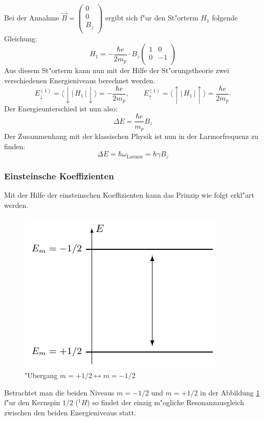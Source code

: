 Bei der Annahme $\vec{B} = \begin{pmatrix}
0 \\
0 \\
B_z \\
\end{pmatrix}$ ergibt sich f"ur den St"orterm $H_1$ folgende Gleichung:
\begin{equation}
H_1 = -\frac{\hbar e}{2m_p} \cdot B_z \begin{pmatrix}
1 & 0 \\
0 & -1 \\
\end{pmatrix}
\end{equation}
Aus diesem St"orterm kann nun mit der Hilfe der St"orungstheorie zwei verschiedenen Energieniveaus berechnet werden.
\begin{equation}
E_\downarrow^{(1)}
=
\langle \downarrow|\, H_1 \,|\downarrow\rangle
=-\frac{\hbar e}{2m_p},
\qquad
E_\uparrow^{(1)}
=
\langle \uparrow|\, H_1 \,|\uparrow\rangle
=\frac{\hbar e}{2m_p}.
\end{equation}
Der Energieunterschied ist nun also:
\begin{equation}
\Delta E = \frac{\hbar e}{m_p}B_z
\end{equation}
Der Zusammenhang mit der klassischen Physik ist nun in der Larmorfrequenz  zu finden:
\begin{equation}
\Delta E = \hbar \omega_{\text{Larmor}}=\hbar \gamma B_z
\end{equation}

\subsubsection{Einsteinsche Koeffizienten}
%
Mit der Hilfe der einsteinschen Koeffizienten kann das Prinzip wie folgt erkl"art werden.
\begin{figure}
	\centering
	\includegraphics{./mri/pic/einsteinischeKoeffizienten}
	\caption{"Ubergang $m=+1/2 \longleftrightarrow m=-1/2$}
	\label{mri:relax}
\end{figure}
Betrachtet man die beiden Niveaus $m= -1/2$ und $m= +1/2$ in der Abbildung \ref{mri:relax} f"ur den Kernspin $1/2$ ($^1H$) so findet der einzig m"ogliche Resonanzausgleich zwischen den beiden Energieniveaus statt. 

